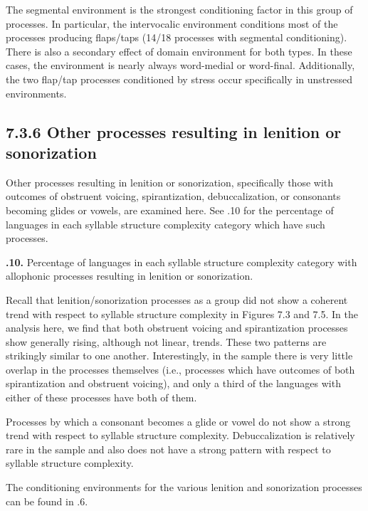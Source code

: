   The segmental environment is the strongest conditioning factor in this group of processes. In particular, the intervocalic environment conditions most of the processes producing flaps/taps (14/18 processes with segmental conditioning). There is also a secondary effect of domain environment for both types. In these cases, the environment is nearly always word-medial or word-final. Additionally, the two flap/tap processes conditioned by stress occur specifically in unstressed environments.


\subsection{7.3.6 Other processes resulting in lenition or sonorization}

  Other processes resulting in lenition or sonorization, specifically those with outcomes of obstruent voicing, spirantization, debuccalization, or consonants becoming glides or vowels, are examined here. See .10 for the percentage of languages in each syllable structure complexity category which have such processes.





\textbf{.10.} Percentage of languages in each syllable structure complexity category with allophonic processes resulting in lenition or sonorization.



  Recall that lenition/sonorization processes as a group did not show a coherent trend with respect to syllable structure complexity in Figures 7.3 and 7.5. In the analysis here, we find that both obstruent voicing and spirantization processes show generally rising, although not linear, trends. These two patterns are strikingly similar to one another. Interestingly, in the sample there is very little overlap in the processes themselves (i.e., processes which have outcomes of both spirantization and obstruent voicing), and only a third of the languages with either of these processes have both of them.



  Processes by which a consonant becomes a glide or vowel do not show a strong trend with respect to syllable structure complexity. Debuccalization is relatively rare in the sample and also does not have a strong pattern with respect to syllable structure complexity.



  The conditioning environments for the various lenition and sonorization processes can be found in .6.






